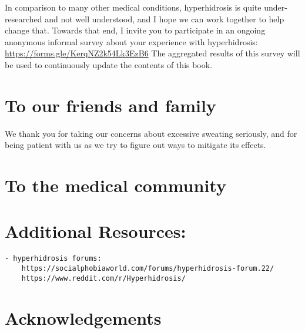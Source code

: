 \documentclass[]{book}
\begin{document}
In comparison to many other medical conditions, hyperhidrosis is quite under-researched and not well understood, and I hope we can work together to help change that.
Towards that end, I invite you to participate in an ongoing anonymous informal survey about your experience with hyperhidrosis:
\url{https://forms.gle/KerqNZ2k54Lk3EzB6}
The aggregated results of this survey will be used to continuously update the contents of this book.

\hypertarget{to-our-friends-and-family}{%
\section{To our friends and family}\label{to-our-friends-and-family}}

We thank you for taking our concerns about excessive sweating seriously, and for being patient with us as we try to figure out ways to mitigate its effects.

\hypertarget{to-the-medical-community}{%
\section{To the medical community}\label{to-the-medical-community}}

\hypertarget{additional-resources}{%
\section{Additional Resources:}\label{additional-resources}}

\begin{verbatim}
- hyperhidrosis forums:
    https://socialphobiaworld.com/forums/hyperhidrosis-forum.22/
    https://www.reddit.com/r/Hyperhidrosis/
\end{verbatim}

\hypertarget{acknowledgements}{%
\section{Acknowledgements}\label{acknowledgements}}


\end{document}
